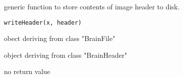 \begin{Description}\relax
generic function to store contents of image header to disk.
\end{Description}
\begin{Usage}
\begin{verbatim}
writeHeader(x, header)
\end{verbatim}
\end{Usage}
\begin{Arguments}
\begin{ldescription}
\item[\code{x}] obect deriving from class "BrainFile" 
\item[\code{header}] object deriving from class "BrainHeader" 
\end{ldescription}
\end{Arguments}
\begin{Value}
no return value
\end{Value}

